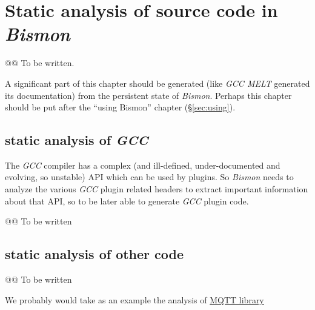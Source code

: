 \section{Static analysis of source code in \emph{Bismon}}
\label{sec:staticanalys}

{\Large @@ To be written.}

A significant part of this chapter should be generated (like \emph{GCC
  MELT} generated its documentation) from the persistent state of
\emph{Bismon}. Perhaps this chapter should be put after the ``using
Bismon'' chapter (§\ref{sec:using}).

\subsection{static analysis of \emph{GCC}}

The \emph{GCC} compiler has a complex (and ill-defined,
under-documented and evolving, so unstable) API which can be used by
plugins. So \emph{Bismon} needs to analyze the various \emph{GCC}
plugin related headers to extract important information about that
API, so to be later able to generate \emph{GCC} plugin code.

@@ To be written

\subsection{static analysis of other code}

@@ To be written

We probably would take as an example the analysis of
\href{http://mqtt.org/}{MQTT library}
